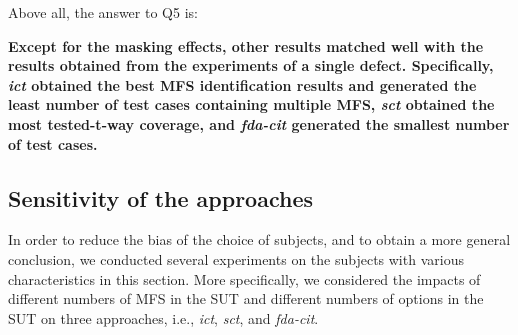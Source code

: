 \documentclass[journal,12pt,onecolumn,draftclsnofoot,]{IEEEtran}
\begin{document}

Above all, the answer to Q5 is:

\textbf{Except for the masking effects, other results matched well with the results obtained from the experiments of a single defect. Specifically, \emph{ict} obtained the best MFS identification results and generated the least number of test cases containing multiple MFS, \emph{sct} obtained the most tested-t-way coverage, and \emph{fda-cit} generated the smallest number of test cases.
}




\subsection{Sensitivity of the approaches}\label{sec:emprical:Sensitivity}
In order to reduce the bias of the choice of subjects, and to obtain a more general conclusion, we conducted several experiments on the subjects with various characteristics in this section.  More specifically, we considered the impacts of different numbers of MFS in the SUT and different numbers of options in the SUT on three approaches, i.e., \emph{ict}, \emph{sct}, and \emph{fda-cit}.
\end{document}
